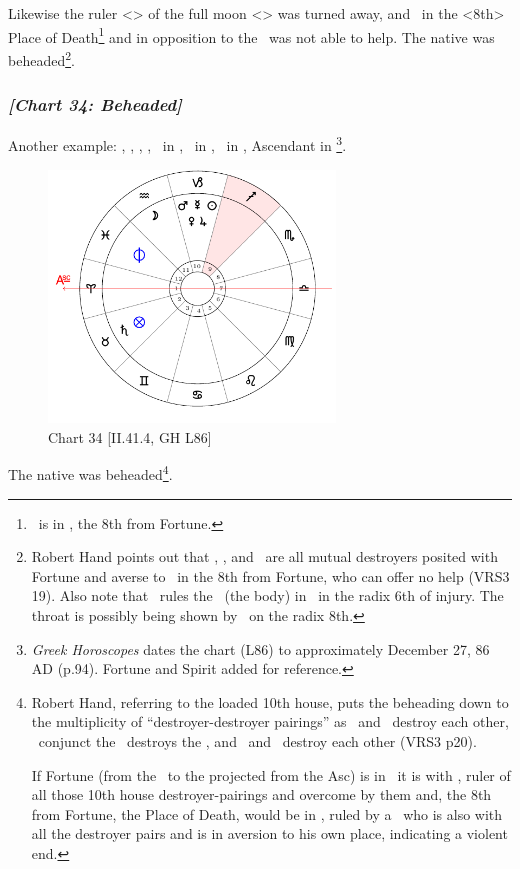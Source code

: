 Likewise the ruler <\Saturn> of the full moon <\Capricorn> was turned away, and \Jupiter\, in the <8th> Place of Death\footnote{\Jupiter\, is in \Capricorn, the 8th from Fortune.} and in opposition to the \Sun\, was not able to help. The native was beheaded\footnote{Robert Hand points out that \Mercury, \Mars, and \Saturn\, are all mutual destroyers posited with Fortune and averse to \Jupiter\, in the 8th from Fortune, who can offer no help (VRS3 19). Also note that \Jupiter\, rules the \Moon\, (the body) in \Pisces\, in the radix 6th of injury. The throat is possibly being shown by \Taurus\, on the radix 8th.}.
\newpage
\subsubsection{\textit{[Chart 34: Beheaded]}}
Another example: \Sun, \Mercury, \Mars, \Jupiter, \Venus\, in \Capricorn, \Moon\, in \Aquarius, \Saturn\, in \Taurus, Ascendant in \Aries
\footnote{\textit{Greek Horoscopes} dates the chart (L86) to approximately December 27, 86 AD (p.94). Fortune and Spirit added for reference.}.

\clearpage
\begin{figure}
\centering
\vspace{-20pt}
\includegraphics[width=0.68\textwidth]{charts/2_41_4}
\caption{Chart 34 [II.41.4, GH L86]}
\label{fig:chart34}
\end{figure} 

The native was beheaded\footnote{Robert Hand, referring to the loaded 10th house, puts the beheading down to the multiplicity of ``destroyer-destroyer pairings'' as  \Jupiter\, and \Venus\, destroy each other, \Jupiter\, conjunct the \Sun\, destroys the \Sun, and \Mercury\, and \Mars\, destroy each other (VRS3 p20).
  
If Fortune (from the \Sun\, to the \Moon projected from the Asc) is in \Taurus\, it is with \Saturn, ruler of all those 10th house destroyer-pairings and overcome by them and, the 8th from Fortune, the Place of Death, would be in \Sagittarius, ruled by a \Jupiter\, who is also with all the destroyer pairs and is in aversion to his own place, indicating a violent end.}.
\newpage
